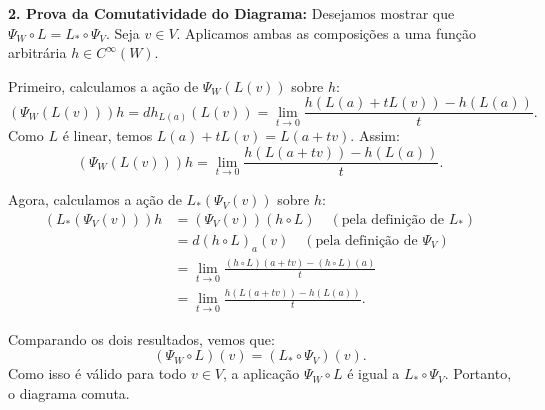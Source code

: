 {	\textbf{2. Prova da Comutatividade do Diagrama:}
	Desejamos mostrar que $\Psi_W \circ L = L_* \circ \Psi_V$. Seja $v \in V$. Aplicamos ambas as composições a uma função arbitrária $h \in C^\infty(W)$.
	
	Primeiro, calculamos a ação de $\Psi_W(L(v))$ sobre $h$:
	\begin{equation*}
		(\Psi_W(L(v))) h = dh_{L(a)}(L(v)) = \lim_{t \to 0} \frac{h(L(a) + tL(v)) - h(L(a))}{t}.
	\end{equation*}
	Como $L$ é linear, temos $L(a) + tL(v) = L(a + tv)$. Assim:
	\begin{equation*}
		(\Psi_W(L(v))) h = \lim_{t \to 0} \frac{h(L(a + tv)) - h(L(a))}{t}.
	\end{equation*}
	
	Agora, calculamos a ação de $L_* (\Psi_V(v))$ sobre $h$:
	\begin{align*}
		(L_* (\Psi_V(v))) h &= (\Psi_V(v))(h \circ L) \quad (\text{pela definição de } L_*) \\
		&= d(h \circ L)_a(v) \quad (\text{pela definição de } \Psi_V) \\
		&= \lim_{t \to 0} \frac{(h \circ L)(a + tv) - (h \circ L)(a)}{t} \\
		&= \lim_{t \to 0} \frac{h(L(a + tv)) - h(L(a))}{t}.
	\end{align*}
	
	Comparando os dois resultados, vemos que:
	\begin{equation*}
		(\Psi_W \circ L)(v) = (L_* \circ \Psi_V)(v).
	\end{equation*}
	Como isso é válido para todo $v \in V$, a aplicação $\Psi_W \circ L$ é igual a $L_* \circ \Psi_V$. Portanto, o diagrama comuta.
}
